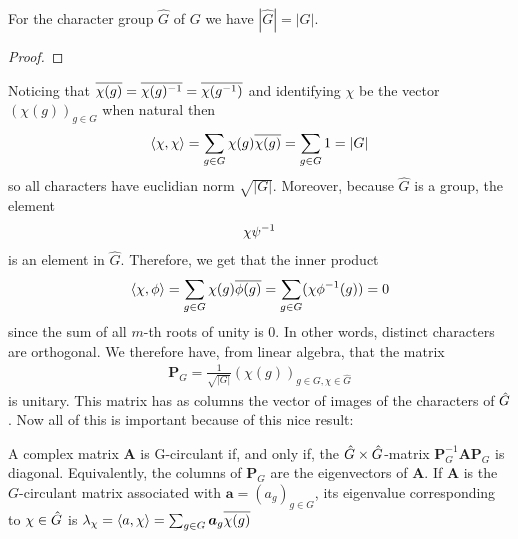     \begin{proposition}
        For the character group \(\hat{G}\) of \(G\) we have \(|\hat{G}| = |G|\).
    \end{proposition}
    \begin{proof}
    \end{proof}
    Noticing that \(\overline{\chi(g)} = \overline{\chi(g)^{-1}} = \overline{\chi(g^{-1})}\) and identifying \(\chi\) be the vector \((\chi(g))_{g\in G}\) when natural then
    \begin{align*}
        \langle \chi, \chi\rangle = \sum\limits_{g\in G}\chi(g)\overline{\chi(g)} = \sum\limits_{g\in G} 1 = |G|
    \end{align*}
    so all characters have euclidian norm \(\sqrt{|G|}\). Moreover, because \(\hat{G}\) is a group, the element
    \begin{align*}
        \chi\psi^{-1}
    \end{align*}
    is an element in \(\hat{G}\). Therefore, we get that the inner product
    \begin{align*}
        \langle\chi ,\phi\rangle = \sum\limits_{g\in G}\chi(g)\overline{\phi(g)} = \sum\limits_{g\in G}(\chi\phi^{-1}(g)) = 0
    \end{align*}
    since the sum of all \(m\)-th roots of unity is 0. In other words, distinct characters are orthogonal. We therefore have, from linear algebra, that the matrix
    \begin{align*}
        \boldsymbol{P}_G = \frac{1}{\sqrt{|G|}}(\chi(g))_{g\in G, \chi\in\hat{G}}
    \end{align*}
    is unitary. This matrix has as columns the vector of images of the characters of \(\Hat{G}\). Now all of this is important because of this nice result:
    \begin{proposition}
        A complex matrix \(\boldsymbol{A}\) is G-circulant if, and only if, the \(\Hat{G}\times\Hat{G}\)-matrix \(\boldsymbol{P}_G^{-1}\boldsymbol{A}\boldsymbol{P}_G\) is diagonal. Equivalently, the columns of \(\boldsymbol{P}_G\) are the eigenvectors of \(\boldsymbol{A}\). If \(\boldsymbol{A}\) is the \(G\)-circulant matrix associated with \(\boldsymbol{a} = (a_g)_{g\in G}\), its eigenvalue corresponding to \(\chi\in\Hat{G}\) is \(\lambda_\chi = \langle a, \chi\rangle = \sum_{g\in G} \boldsymbol{a}_g\overline{\chi(g)}\)
    \end{proposition}
